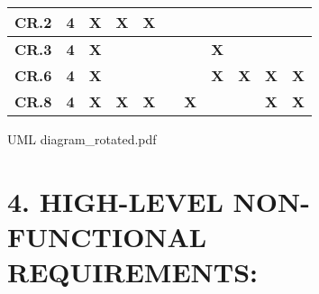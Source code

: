 \documentclass[9pt]{report}
\begin{document}
\begin{tabular}{|p{2cm}|p{2cm}|p{1cm}|p{1cm}|p{1cm}|p{1cm}|p{1cm}|p{1cm}|p{1cm}|p{1cm}|p{1cm}|}
 \hline
 \textbf{CR.2} & \textbf{4} & \textbf{X} & \textbf{X} & \textbf{X} & \textbf{} & \textbf{} & \textbf{} & \textbf{} & \textbf{} & \textbf{}\\
 \hline
 \textbf{CR.3} & \textbf{4} & \textbf{X} & \textbf{} & \textbf{} & \textbf{} & \textbf{} & \textbf{X} & \textbf{} & \textbf{} & \textbf{}\\
 \hline
 \textbf{CR.6} & \textbf{4} & \textbf{X} & \textbf{} & \textbf{} & \textbf{} & \textbf{} & \textbf{X} & \textbf{X} & \textbf{X} & \textbf{X}\\
 \hline
 \textbf{CR.8} & \textbf{4} & \textbf{X} & \textbf{X} & \textbf{X} & \textbf{} & \textbf{X} & \textbf{} & \textbf{} & \textbf{X} & \textbf{X}\\
 \hline
\end{tabular}

{UML diagram_rotated.pdf}


\newpage
\section*{4. HIGH-LEVEL NON-FUNCTIONAL REQUIREMENTS:}
\end{document}

